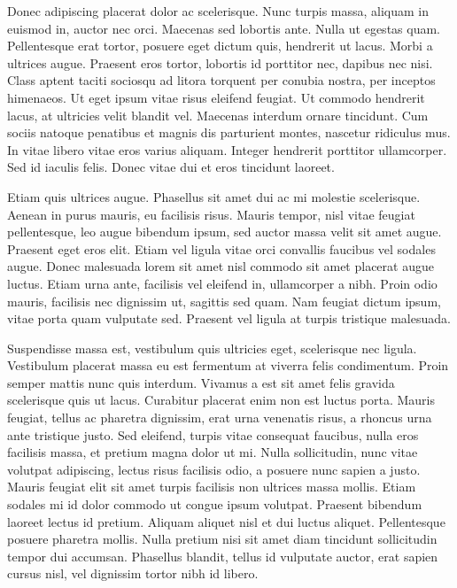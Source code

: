 Donec adipiscing placerat dolor ac scelerisque. Nunc turpis massa, aliquam in euismod in, auctor nec orci. Maecenas sed lobortis ante. Nulla ut egestas quam. Pellentesque erat tortor, posuere eget dictum quis, hendrerit ut lacus. Morbi a ultrices augue. Praesent eros tortor, lobortis id porttitor nec, dapibus nec nisi. Class aptent taciti sociosqu ad litora torquent per conubia nostra, per inceptos himenaeos. Ut eget ipsum vitae risus eleifend feugiat. Ut commodo hendrerit lacus, at ultricies velit blandit vel. Maecenas interdum ornare tincidunt. Cum sociis natoque penatibus et magnis dis parturient montes, nascetur ridiculus mus. In vitae libero vitae eros varius aliquam. Integer hendrerit porttitor ullamcorper. Sed id iaculis felis. Donec vitae dui et eros tincidunt laoreet.

Etiam quis ultrices augue. Phasellus sit amet dui ac mi molestie scelerisque. Aenean in purus mauris, eu facilisis risus. Mauris tempor, nisl vitae feugiat pellentesque, leo augue bibendum ipsum, sed auctor massa velit sit amet augue. Praesent eget eros elit. Etiam vel ligula vitae orci convallis faucibus vel sodales augue. Donec malesuada lorem sit amet nisl commodo sit amet placerat augue luctus. Etiam urna ante, facilisis vel eleifend in, ullamcorper a nibh. Proin odio mauris, facilisis nec dignissim ut, sagittis sed quam. Nam feugiat dictum ipsum, vitae porta quam vulputate sed. Praesent vel ligula at turpis tristique malesuada.

Suspendisse massa est, vestibulum quis ultricies eget, scelerisque nec ligula. Vestibulum placerat massa eu est fermentum at viverra felis condimentum. Proin semper mattis nunc quis interdum. Vivamus a est sit amet felis gravida scelerisque quis ut lacus. Curabitur placerat enim non est luctus porta. Mauris feugiat, tellus ac pharetra dignissim, erat urna venenatis risus, a rhoncus urna ante tristique justo. Sed eleifend, turpis vitae consequat faucibus, nulla eros facilisis massa, et pretium magna dolor ut mi. Nulla sollicitudin, nunc vitae volutpat adipiscing, lectus risus facilisis odio, a posuere nunc sapien a justo. Mauris feugiat elit sit amet turpis facilisis non ultrices massa mollis. Etiam sodales mi id dolor commodo ut congue ipsum volutpat. Praesent bibendum laoreet lectus id pretium. Aliquam aliquet nisl et dui luctus aliquet. Pellentesque posuere pharetra mollis. Nulla pretium nisi sit amet diam tincidunt sollicitudin tempor dui accumsan. Phasellus blandit, tellus id vulputate auctor, erat sapien cursus nisl, vel dignissim tortor nibh id libero. 


